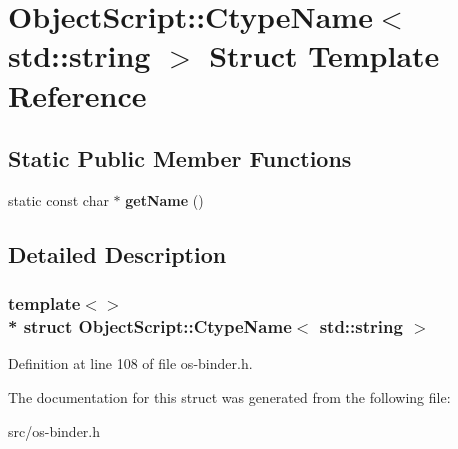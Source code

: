 \hypertarget{struct_object_script_1_1_ctype_name_3_01std_1_1string_01_4}{}\section{Object\+Script\+:\+:Ctype\+Name$<$ std\+:\+:string $>$ Struct Template Reference}
\label{struct_object_script_1_1_ctype_name_3_01std_1_1string_01_4}
\subsection*{Static Public Member Functions}
\begin{DoxyCompactItemize}
\item 
static const char $\ast$ {\bfseries get\+Name} ()\hypertarget{struct_object_script_1_1_ctype_name_3_01std_1_1string_01_4_a3ead7933eedb983cc9973503a31fa994}{}\label{struct_object_script_1_1_ctype_name_3_01std_1_1string_01_4_a3ead7933eedb983cc9973503a31fa994}

\end{DoxyCompactItemize}


\subsection{Detailed Description}
\subsubsection*{template$<$$>$\\*
struct Object\+Script\+::\+Ctype\+Name$<$ std\+::string $>$}



Definition at line 108 of file os-\/binder.\+h.



The documentation for this struct was generated from the following file\+:\begin{DoxyCompactItemize}
\item 
src/os-\/binder.\+h\end{DoxyCompactItemize}
